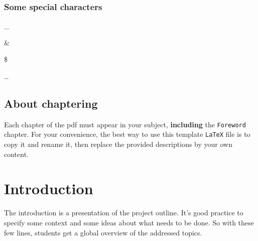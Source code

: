 \documentclass{42-en}
\begin{document}
        \newpage


        \subsection{Some special characters}

            \begin{description}\itemsep1pt
                \item [Underscore:] \_
                \item [Ampersand:] \&
                \item [Dollar:] \$
                \item [Elipsis:] \dots
            \end{description}


    \section{About chaptering}

    Each chapter of the pdf must appear in your subject,
    \textbf{including} the \texttt{Foreword} chapter. For your
    convenience, the best way to use this template \texttt{LaTeX} file is
    to copy it and rename it, then replace the provided descriptions by
    your own content.\\


\chapter{Introduction}

    The introduction is a presentation of the project outline. It's good
    practice to specify some context and some ideas about what needs to be
    done. So with these few lines, students get a global overview
    of the addressed topics.
\end{document}
